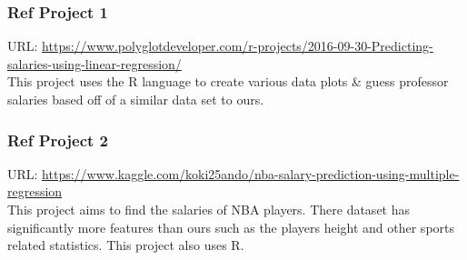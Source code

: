\documentclass[14pt, letterpaper]{extarticle}
\begin{document}
            \subsubsection{Ref Project 1}
                URL: \url{https://www.polyglotdeveloper.com/r-projects/2016-09-30-Predicting-salaries-using-linear-regression/} 
                \\
                This project uses the R language to create various data plots \& guess professor salaries based off of a similar data set to ours.

            \subsubsection{Ref Project 2}
                URL: \url{https://www.kaggle.com/koki25ando/nba-salary-prediction-using-multiple-regression}
                \\
                This project aims to find the salaries of NBA players. There dataset has significantly more features than ours such as the players height and other sports related statistics. This project also uses R.
\end{document}

